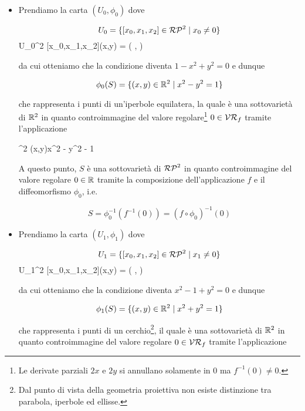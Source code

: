 \begin{itemize}
	\item Prendiamo la carta $ (U_{0},\phi_{0}) $ dove
	
	\begin{equation}
		U_{0} = \{ [x_{0},x_{1},x_{2}] \in \mathcal{RP}^{2} \mid x_{0} \neq 0 \}
	\end{equation}
		{U_{0}}{\R^{2}}
		{[x_{0},x_{1},x_{2}]}{(x,y) = \left( ,  \right)}
	
	da cui otteniamo che la condizione diventa $ 1 - x^{2} + y^{2} = 0 $ e dunque
	
	\begin{equation}
		\phi_{0}(S) = \{ (x,y) \in \mathbb{R}^{2} \mid x^{2} - y^{2} = 1 \}
	\end{equation}

	che rappresenta i punti di un'iperbole equilatera, la quale è una sottovarietà di $ \mathbb{R}^{2} $ in quanto controimmagine del valore regolare\footnote{%
		Le derivate parziali $ 2x $ e $ 2y $ si annullano solamente in 0 ma $ f^{-1}(0) \neq 0 $.%
	} $ 0 \in \mathcal{VR}_{f} $ tramite l'applicazione
	
		{\R^{2}}{\R}
		{(x,y)}{x^{2} - y^{2} - 1}
	
	A questo punto, $ S $ è una sottovarietà di $ \mathcal{RP}^{2} $ in quanto controimmagine del valore regolare $ 0 \in \mathbb{R} $ tramite la composizione dell'applicazione $ f $	e il diffeomorfismo $ \phi_{0} $, i.e.
	
	\begin{equation}
		S = \phi_{0}^{-1} (f^{-1}(0)) = (f \circ \phi_{0})^{-1} (0)
	\end{equation}
	
	\item Prendiamo la carta $ (U_{1},\phi_{1}) $ dove
	
	\begin{equation}
		U_{1} = \{ [x_{0},x_{1},x_{2}] \in \mathcal{RP}^{2} \mid x_{1} \neq 0 \}
	\end{equation}
		{U_{1}}{\R^{2}}
		{[x_{0},x_{1},x_{2}]}{(x,y) = \left( ,  \right)}
	
	da cui otteniamo che la condizione diventa $ x^{2} - 1 + y^{2} = 0 $ e dunque
	
	\begin{equation}
		\phi_{1}(S) = \{ (x,y) \in \mathbb{R}^{2} \mid x^{2} + y^{2} = 1 \}
	\end{equation}
	
	che rappresenta i punti di un cerchio\footnote{%
		Dal punto di vista della geometria proiettiva non esiste distinzione tra parabola, iperbole ed ellisse.%
	}, il quale è una sottovarietà di $ \mathbb{R}^{2} $ in quanto controimmagine del valore regolare $ 0 \in \mathcal{VR}_{f} $ tramite l'applicazione
	

\end{itemize}
